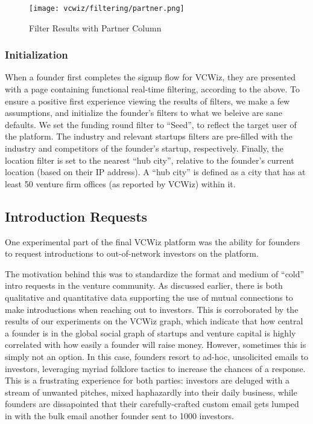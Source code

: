 \begin{figure}[ht]
  \texttt{[image: vcwiz/filtering/partner.png]}
  \centering
  \caption*{Filter Results with Partner Column}
\end{figure}

\subsubsection{Initialization}

When a founder first completes the signup flow for VCWiz, they are presented with a page containing functional real-time filtering, according to the above. To ensure a positive first experience viewing the results of filters, we make a few assumptions, and initialize the founder's filters to what we beleive are sane defaults. We set the funding round filter to ``Seed'', to reflect the target user of the platform. The industry and relevant startups filters are pre-filled with the industry and competitors of the founder's startup, respectively. Finally, the location filter is set to the nearest ``hub city'', relative to the founder's current location (based on their IP address). A ``hub city'' is defined as a city that has at least 50 venture firm offices (as reported by VCWiz) within it.

\subsection{Introduction Requests}
\label{chap4:introrequests}

One experimental part of the final VCWiz platform was the ability for founders to request introductions to out-of-network investors on the platform.

The motivation behind this was to standardize the format and medium of ``cold'' intro requests in the venture community. As discussed earlier, there is both qualitative and quantitative data supporting the use of mutual connections to make introductions when reaching out to investors. This is corroborated by the results of our experiments on the VCWiz graph, which indicate that how central a founder is in the global social graph of startups and venture capital is highly correlated with how easily a founder will raise money. However, sometimes this is simply not an option. In this case, founders resort to ad-hoc, unsolicited emails to investors, leveraging myriad folklore tactics to increase the chances of a response. This is a frustrating experience for both parties: investors are deluged with a stream of unwanted pitches, mixed haphazardly into their daily business, while founders are dissapointed that their carefully-crafted custom email gets lumped in with the bulk email another founder sent to 1000 investors.

